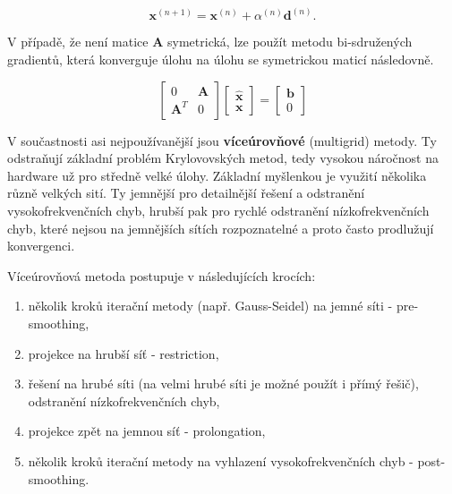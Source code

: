 \documentclass[a4paper,12pt]{report}
\theoremstyle{remark}
\begin{document}
\begin{equation*}
	\boldsymbol{x}^{(n+1)} = \boldsymbol{x}^{(n)} + \alpha^{(n)} \boldsymbol{d}^{(n)}.
	\label{eq:grad_cg}
\end{equation*}

V případě, že není matice $\boldsymbol{A}$ symetrická, lze použít metodu bi-sdružených gradientů, která konverguje úlohu na úlohu se symetrickou maticí následovně.

\begin{equation}
	\begin{bmatrix}
		0 & \boldsymbol{A}\\
		\boldsymbol{A}^T & 0
	\end{bmatrix}
	\begin{bmatrix}
		\hat{\boldsymbol{x}}\\
		\boldsymbol{x}
	\end{bmatrix} =
	\begin{bmatrix}
		\boldsymbol{b}\\
		0
	\end{bmatrix}
\end{equation}


V součastnosti asi nejpoužívanější jsou \textbf{víceúrovňové} (multigrid) metody. Ty odstraňují základní problém Krylovovských metod, tedy vysokou náročnost na hardware už pro středně velké úlohy. Základní myšlenkou je využití několika různě velkých sití. Ty jemnější pro detailnější řešení a odstranění vysokofrekvenčních chyb, hrubší pak pro rychlé odstranění nízkofrekvenčních chyb, které nejsou na jemnějších sítích rozpoznatelné a proto často prodlužují konvergenci. 

Víceúrovňová metoda postupuje v následujících krocích:
\begin{enumerate}
	\item několik kroků iterační metody (např. Gauss-Seidel) na jemné síti - pre-smoothing,
	\item projekce na hrubší síť - restriction,
	\item řešení na hrubé síti (na velmi hrubé síti je možné použít i přímý řešič), odstranění nízkofrekvenčních chyb,
	\item projekce zpět na jemnou síť - prolongation,
	\item několik kroků iterační metody na vyhlazení vysokofrekvenčních chyb - post-smoothing.
\end{enumerate}
\end{document}
